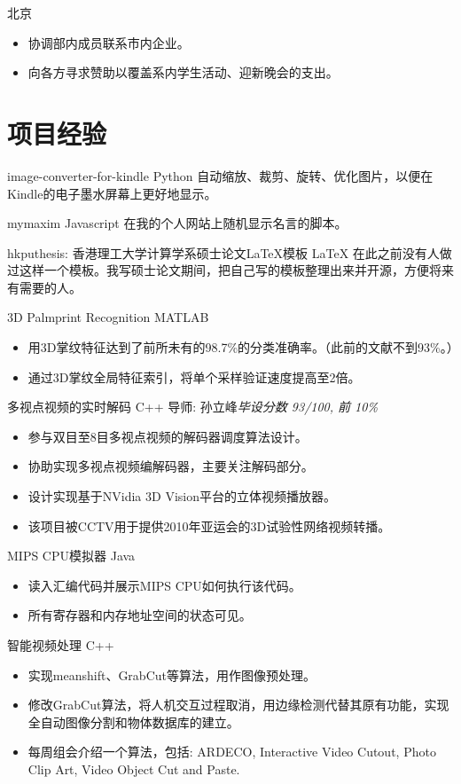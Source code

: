 \documentclass[11pt,a4paper]{moderncv/moderncv}
\begin{document}
{北京}{}
{
\begin{itemize}
	\item 协调部内成员联系市内企业。
	\item 向各方寻求赞助以覆盖系内学生活动、迎新晚会的支出。
\end{itemize}
}

\section{项目经验}
{image-converter-for-kindle}
{Python}
{}{}
{
自动缩放、裁剪、旋转、优化图片，以便在Kindle的电子墨水屏幕上更好地显示。
}

{mymaxim}
{Javascript}
{}{}
{
在我的个人网站上随机显示名言的脚本。
}

{hkputhesis: 香港理工大学计算学系硕士论文\LaTeX 模板}
{LaTeX}
{}{}
{
在此之前没有人做过这样一个模板。我写硕士论文期间，把自己写的模板整理出来并开源，方便将来有需要的人。
}

{3D Palmprint Recognition}
{MATLAB}
{}{}
{
\begin{itemize}
	\item 用3D掌纹特征达到了前所未有的98.7\%的分类准确率。（此前的文献不到93\%。）
	\item 通过3D掌纹全局特征索引，将单个采样验证速度提高至2倍。
\end{itemize}
}

{多视点视频的实时解码}
{C++}
{导师: 孙立峰}{\textit{毕设分数 93/100, 前 10\%}}
{
\begin{itemize}
	\item 参与双目至8目多视点视频的解码器调度算法设计。
	\item 协助实现多视点视频编解码器，主要关注解码部分。
	\item 设计实现基于NVidia 3D Vision平台的立体视频播放器。
	\item 该项目被CCTV用于提供2010年亚运会的3D试验性网络视频转播。
\end{itemize}
}

{MIPS CPU模拟器}
{Java}
{}{}
{
\begin{itemize}
	\item 读入汇编代码并展示MIPS CPU如何执行该代码。
	\item 所有寄存器和内存地址空间的状态可见。
\end{itemize}
}

{智能视频处理}
{C++}
{}{}
{
\begin{itemize}
	\item 实现meanshift、GrabCut等算法，用作图像预处理。
	\item 修改GrabCut算法，将人机交互过程取消，用边缘检测代替其原有功能，实现全自动图像分割和物体数据库的建立。
	\item 每周组会介绍一个算法，包括: ARDECO, Interactive Video Cutout, Photo Clip Art, Video Object Cut and Paste.
\end{itemize}
}
\end{document}
